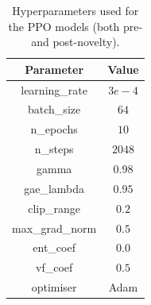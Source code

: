 % 
\begin{table}[h]
  \small
  \begin{center}
\begin{tabular}{@{}cc@{}}
     \arrayrulecolor{taupegray} \toprule
    \textbf{Parameter} & \textbf{Value} \\  \midrule
    learning\_rate & $3e-4 $ \\ \midrule
    batch\_size & $64 $ \\ \midrule
    n\_epochs & $10 $ \\ \midrule
    n\_steps & $2048 $ \\ \midrule
    gamma & $0.98 $ \\ \midrule
    gae\_lambda & $0.95 $ \\ \midrule
    clip\_range & $0.2 $ \\ \midrule
    max\_grad\_norm & $0.5 $ \\ \midrule
    ent\_coef & $0.0 $ \\ \midrule
    vf\_coef & $0.5 $ \\ \midrule
    optimiser & Adam \\ \midrule
  \end{tabular}
  \end{center}
  \caption{Hyperparameters used for the PPO models (both pre- and post-novelty).}\label{tab:hyper_baselines}
\end{table}
% 